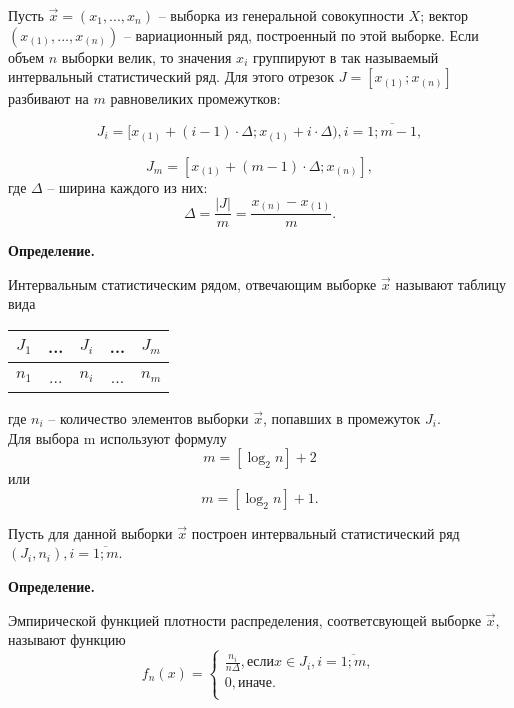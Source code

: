 Пусть $\vec x=(x_1, ..., x_n)$ -- выборка из генеральной совокупности $X$; вектор $(x_{(1)}, ..., x_{(n)})$ -- вариационный ряд, построенный по этой выборке.  Если объем $n$ выборки велик, то значения $x_i$ группируют в так называемый интервальный статистический ряд. Для этого отрезок $J = [x_{(1)}; x_{(n)}]$ разбивают на $m$ равновеликих промежутков:

\begin{equation*}
    J_i = [x_{(1)} + (i - 1) \cdot \Delta; x_{(1)} + i \cdot \Delta), i = \overline{1; m - 1},
\end{equation*}

\begin{equation*}
    J_{m} = [x_{(1)} + (m - 1) \cdot \Delta; x_{(n)}],
\end{equation*}
где $\Delta$ -- ширина каждого из них:
\begin{equation*}
    \Delta = \frac{|J|}{m} = \frac{x_{(n)} - x_{(1)}}{m}.
\end{equation*}

\textbf{Определение.}

Интервальным статистическим рядом, отвечающим выборке $\vec x$ называют таблицу вида

\begin{table}[htb]
    \centering
    \begin{tabular}{|c|c|c|c|c|}
        \hline
        $J_1$ & ... & $J_i$ & ... & $J_m$ \\
        \hline
        $n_1$ & ... & $n_i$ & ... & $n_m$ \\
        \hline
    \end{tabular}
\end{table}где $n_i$ -- количество элементов выборки $\vec x$, попавших в  промежуток $J_i$.
\\
Для выбора m используют формулу
\begin{equation*}
	m=[\log_2n]+2
\end{equation*}
или
\begin{equation*}
	m=[\log_2n]+1.
\end{equation*}


Пусть для данной выборки $\vec x$ построен интервальный статистический ряд $(J_i, n_i), i = \overline{1; m}$.

\textbf{Определение.}

Эмпирической функцией плотности распределения, соответсвующей выборке $\vec x$, называют функцию
\begin{equation*}
    f_n(x) =
    \begin{cases}
        \frac{n_i}{n \Delta}, если x \in J_i, i = \overline{1; m}, \\
        0, \text{иначе.} \\
    \end{cases}
\end{equation*}


